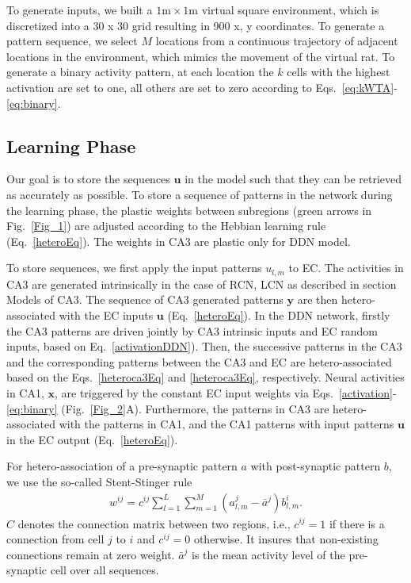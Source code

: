 \documentclass[utf8]{frontiersSCNS} %
\begin{document}
To generate inputs, we built a $1\textrm{m} \times 1\textrm{m}$ virtual square environment, which is discretized into a 30 x 30 grid resulting in 900 x, y coordinates.   
To generate a pattern sequence, we select $M$ locations from a continuous trajectory of adjacent locations in the environment, which mimics the movement of the virtual rat. To generate a binary activity pattern, at each location the $k$ cells with the highest activation are set to one, all others are set to zero according to Eqs.~\ref{eq:kWTA}-\ref{eq:binary}.


\subsection{Learning Phase}
\label{learning}
Our goal is to store the sequences $\mathbf u$ in the model such that they can be retrieved as accurately as possible. To store a sequence of patterns in the network during the learning phase, the plastic weights between subregions (green arrows in Fig.~\ref{Fig_1}) are adjusted according to the Hebbian learning rule (Eq.~\ref{heteroEq}). 
%
The weights in CA3 are plastic only for DDN model.

To store sequences, we first apply the input patterns $u_{l,m}$ to EC. The activities in CA3 are generated intrinsically in the case of RCN, LCN as described in section Models of CA3. The sequence of CA3 generated patterns $\mathbf y$ are then hetero-associated with the EC inputs $\mathbf u$ (Eq.~\ref{heteroEq}). 
%
In the DDN network, firstly the CA3 patterns are driven jointly by CA3 intrinsic inputs and EC random inputs, based on Eq.~\ref{activationDDN}). Then, the successive patterns in the CA3 and the corresponding patterns between the CA3 and EC are hetero-associated based on the Eqs.~\ref{heteroca3Eq} and \ref{heteroca3Eq}, respectively.
%
Neural activities in CA1, $\mathbf x$, are triggered by the constant EC input weights via Eqs.~\ref{activation}-\ref{eq:binary} (Fig.~\ref{Fig_2}A). Furthermore, the patterns in CA3 are hetero-associated with the patterns in CA1, and the CA1 patterns with input patterns $\mathbf u$ in the EC output (Eq.~\ref{heteroEq}). 

For hetero-association of a pre-synaptic pattern $a$ with post-synaptic pattern $b$, we use the so-called Stent-Stinger rule \cite{stent1973physiological}
%
\begin{align}
	\label{heteroEq}
	w^{ij} = c^{ij}\sum_{l=1}^L{\sum_{m=1}^M(a^j_{l, m}  - \bar {a}^j)b_{l, m}^i}.
\end{align}
$C$ denotes the connection matrix between two regions, i.e., $c^{ij} = 1$ if there is a connection from cell $j$ to $i$ and $c^{ij} = 0$ otherwise. It insures that non-existing connections remain at zero weight. $\bar{a}^j$ is the mean activity level of the pre-synaptic cell over all sequences. 
\end{document}
